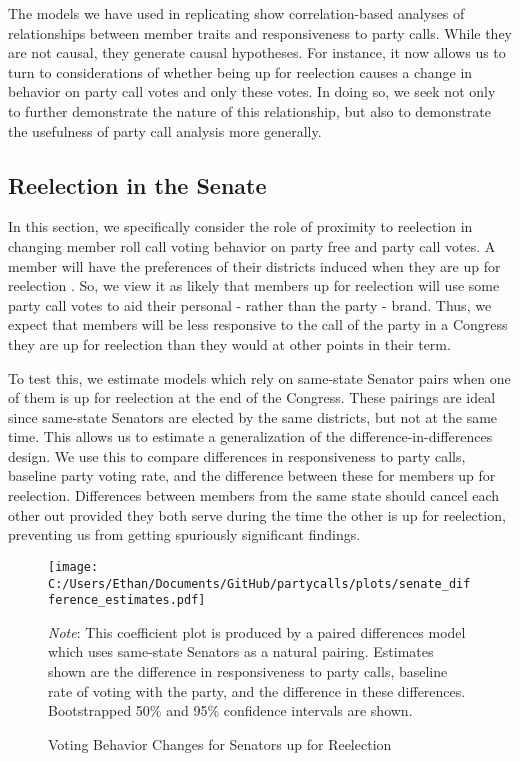 \documentclass[12pt]{article}
\newcommand\fnote[1]{\captionsetup{font=small}\caption*{#1}}
\begin{document}
The models we have used in replicating \cite{Minozzi:2013} show correlation-based analyses of relationships between member traits and responsiveness to party calls. While they are not causal, they generate causal hypotheses. For instance, it now allows us to turn to considerations of whether being up for reelection causes a change in behavior on party call votes and only these votes. In doing so, we seek not only to further demonstrate the nature of this relationship, but also to demonstrate the usefulness of party call analysis more generally.

\subsection*{Reelection in the Senate}

In this section, we specifically consider the role of proximity to reelection in changing member roll call voting behavior on party free and party call votes. A member will have the preferences of their districts induced when they are up for reelection \cite{Levitt:1996}. So, we view it as likely that members up for reelection will use some party call votes to aid their personal - rather than the party - brand. Thus, we expect that members will be less responsive to the call of the party in a Congress they are up for reelection than they would at other points in their term.

To test this, we estimate models which rely on same-state Senator pairs when one of them is up for reelection at the end of the Congress. These pairings are ideal since same-state Senators are elected by the same districts, but not at the same time. This allows us to estimate a generalization of the difference-in-differences design. We use this to compare differences in responsiveness to party calls, baseline party voting rate, and the difference between these for members up for reelection. Differences between members from the same state should cancel each other out provided they both serve during the time the other is up for reelection, preventing us from getting spuriously significant findings.

\begin{figure}[H]
	\centering
	\caption{Voting Behavior Changes for Senators up for Reelection}
	\texttt{[image: C:/Users/Ethan/Documents/GitHub/partycalls/plots/senate\_difference\_estimates.pdf]}
	\fnote{\textit{Note}: This coefficient plot is produced by a paired differences model which uses same-state Senators as a natural pairing. Estimates shown are the difference in responsiveness to party calls, baseline rate of voting with the party, and the difference in these differences. Bootstrapped 50\% and 95\% confidence intervals are shown.}
\end{figure}
\end{document}
